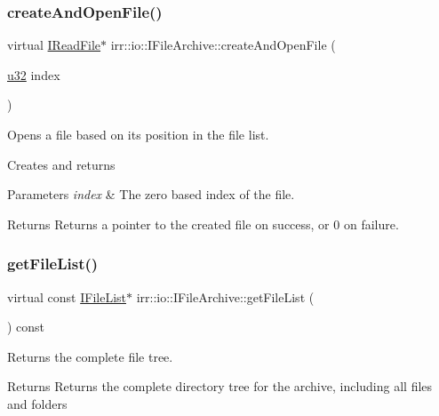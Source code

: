 \subsubsection{\texorpdfstring{create\+And\+Open\+File()}{createAndOpenFile()}\hspace{0.1cm}{\footnotesize\ttfamily [2/2]}}
{\footnotesize\ttfamily virtual \hyperlink{classirr_1_1io_1_1IReadFile}{I\+Read\+File}$\ast$ irr\+::io\+::\+I\+File\+Archive\+::create\+And\+Open\+File (\begin{DoxyParamCaption}\item[{\hyperlink{namespaceirr_a0416a53257075833e7002efd0a18e804}{u32}}]{index }\end{DoxyParamCaption})\hspace{0.3cm}{\ttfamily [pure virtual]}}



Opens a file based on its position in the file list. 

Creates and returns 
\begin{DoxyParams}{Parameters}
{\em index} & The zero based index of the file. \\
\hline
\end{DoxyParams}
\begin{DoxyReturn}{Returns}
Returns a pointer to the created file on success, or 0 on failure. 
\end{DoxyReturn}
\mbox{\label{classirr_1_1io_1_1IFileArchive_a73c683318837b13d16843373da00ded3}} 
\subsubsection{\texorpdfstring{get\+File\+List()}{getFileList()}}
{\footnotesize\ttfamily virtual const \hyperlink{classirr_1_1io_1_1IFileList}{I\+File\+List}$\ast$ irr\+::io\+::\+I\+File\+Archive\+::get\+File\+List (\begin{DoxyParamCaption}{ }\end{DoxyParamCaption}) const\hspace{0.3cm}{\ttfamily [pure virtual]}}



Returns the complete file tree. 

\begin{DoxyReturn}{Returns}
Returns the complete directory tree for the archive, including all files and folders 
\end{DoxyReturn}


